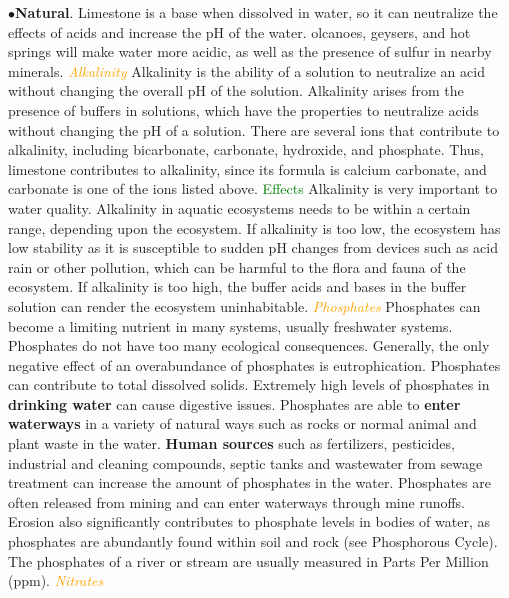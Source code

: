 \documentclass{article}
\newcommand{\ddd}{$\bullet$}
\newcommand{\green}[1]{\textcolor{green}{#1}}
\newcommand{\orange}[1]{\textcolor{orange}{#1}}
\newcommand{\mysubsection}[1]{{\textit{\orange{#1}}}}
\newcommand{\mysubsub}[1]{{{\green{#1}}}}
\begin{document}
\begin{multicols*}{4}
            \ddd \textbf{Natural}. Limestone is a base when dissolved in water, so it can neutralize the effects of acids and increase the pH of the water. olcanoes, geysers, and hot springs will make water more acidic, as well as the presence of sulfur in nearby minerals.
        \mysubsection{Alkalinity}
            Alkalinity is the ability of a solution to neutralize an acid without changing the overall pH of the solution. Alkalinity arises from the presence of buffers in solutions, which have the properties to neutralize acids without changing the pH of a solution.  There are several ions that contribute to alkalinity, including bicarbonate, carbonate, hydroxide, and phosphate. Thus, limestone contributes to alkalinity, since its formula is calcium carbonate, and carbonate is one of the ions listed above. 
            \mysubsub{Effects}  Alkalinity is very important to water quality. Alkalinity in aquatic ecosystems needs to be within a certain range, depending upon the ecosystem. If alkalinity is too low, the ecosystem has low stability as it is susceptible to sudden pH changes from devices such as acid rain or other pollution, which can be harmful to the flora and fauna of the ecosystem. If alkalinity is too high, the buffer acids and bases in the buffer solution can render the ecosystem uninhabitable.
        \mysubsection{Phosphates}
            Phosphates can become a limiting nutrient in many systems, usually freshwater systems. Phosphates do not have too many ecological consequences. Generally, the only negative effect of an overabundance of phosphates is eutrophication. Phosphates can contribute to total dissolved solids. Extremely high levels of phosphates in \textbf{drinking water} can cause digestive issues. Phosphates are able to \textbf{enter waterways} in a variety of natural ways such as rocks or normal animal and plant waste in the water. \textbf{Human sources} such as fertilizers, pesticides, industrial and cleaning compounds, septic tanks and wastewater from sewage treatment can increase the amount of phosphates in the water. Phosphates are often released from mining and can enter waterways through mine runoffs. Erosion also significantly contributes to phosphate levels in bodies of water, as phosphates are abundantly found within soil and rock (see Phosphorous Cycle). The phosphates of a river or stream are usually measured in Parts Per Million (ppm).
        \mysubsection{Nitrates}

\end{multicols*}
\end{document}
